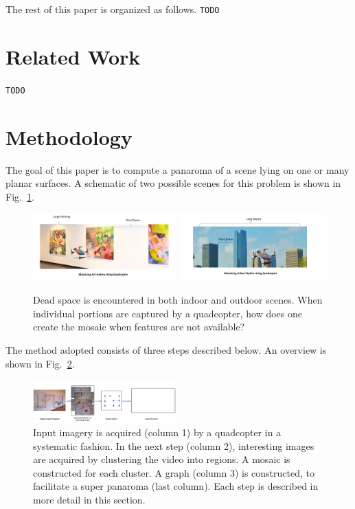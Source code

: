 \documentclass[10pt,twocolumn,letterpaper]{article}
\begin{document}
The rest of this paper is organized as follows.
\verb+TODO+

\section{Related Work}
\verb+TODO+

\section{Methodology}

The goal of this paper is to compute a panaroma of a scene lying on
one or many planar surfaces.  A schematic of two possible scenes for
this problem is shown in Fig.~\ref{fig:schematic}.

\begin{figure}[h!]
  \centering
  \includegraphics[width=0.49\textwidth]{figures/indoor} 
  \includegraphics[width=0.49\textwidth]{figures/outdoor}
  \caption{ \label{fig:schematic} Dead space is
    encountered in both indoor and outdoor scenes.  When individual
    portions are captured by a quadcopter, how does one create the
    mosaic when features are not available?
  }
\end{figure}    


The method adopted consists of three steps described below. An
overview is shown in Fig.~\ref{fig:workflow}.

\begin{figure}[b!]
  \centering
  \includegraphics[width=0.49\textwidth]{figures/Workflow} 
  \caption{ \label{fig:workflow} Input imagery is acquired (column 1) by
    a quadcopter in a systematic fashion.  In the next step (column 2),
    interesting images are acquired by clustering the video into
    regions. A mosaic is constructed for each cluster.  A graph
    (column 3) is constructed, to facilitate a super panaroma (last
    column). Each step is described in more detail in this section.
  }
\end{figure}    
\end{document}
